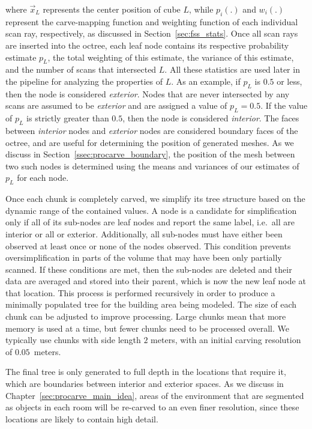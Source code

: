 \documentclass[12pt,onecolumn,oneside]{book}
\begin{document}
where $\vec{x}_L$ represents the center position of cube $L$, while $p_i(.)$ and $w_i(.)$ represent the carve-mapping function and weighting function of each individual scan ray, respectively, as discussed in Section~\ref{sec:fss_stats}.  Once all scan rays are inserted into the octree, each leaf node contains its respective probability estimate $p_L$, the total weighting of this estimate, the variance of this estimate, and the number of scans that intersected $L$.  All these statistics are used later in the pipeline for analyzing the properties of $L$.  As an example, if $p_L$ is $0.5$ or less, then the node is considered {\it exterior}.  Nodes that are never intersected by any scans are assumed to be {\it exterior} and are assigned a value of $p_L=0.5$.  If the value of $p_L$ is strictly greater than $0.5$, then the node is considered {\it interior}.  The faces between {\it interior} nodes and {\it exterior} nodes are considered boundary faces of the octree, and are useful for determining the position of generated meshes.  As we discuss in Section~\ref{ssec:procarve_boundary}, the position of the mesh between two such nodes is determined using the means and variances of our estimates of $p_L$ for each node.

Once each chunk is completely carved, we simplify its tree structure based on the dynamic range of the contained values.  A node is a candidate for simplification only if all of its sub-nodes are leaf nodes and report the same label, i.e.\ all are interior or all or exterior.  Additionally, all sub-nodes must have either been observed at least once or none of the nodes observed.  This condition prevents oversimplification in parts of the volume that may have been only partially scanned.  If these conditions are met, then the sub-nodes are deleted and their data are averaged and stored into their parent, which is now the new leaf node at that location.  This process is performed recursively in order to produce a minimally populated tree for the building area being modeled.  The size of each chunk can be adjusted to improve processing.  Large chunks mean that more memory is used at a time, but fewer chunks need to be processed overall.  We typically use chunks with side length $2$ meters, with an initial carving resolution of $0.05$~meters.

The final tree is only generated to full depth in the locations that require it, which are boundaries between interior and exterior spaces.  As we discuss in Chapter~\ref{sec:procarve_main_idea}, areas of the environment that are segmented as objects in each room will be re-carved to an even finer resolution, since these locations are likely to contain high detail.
\end{document}
